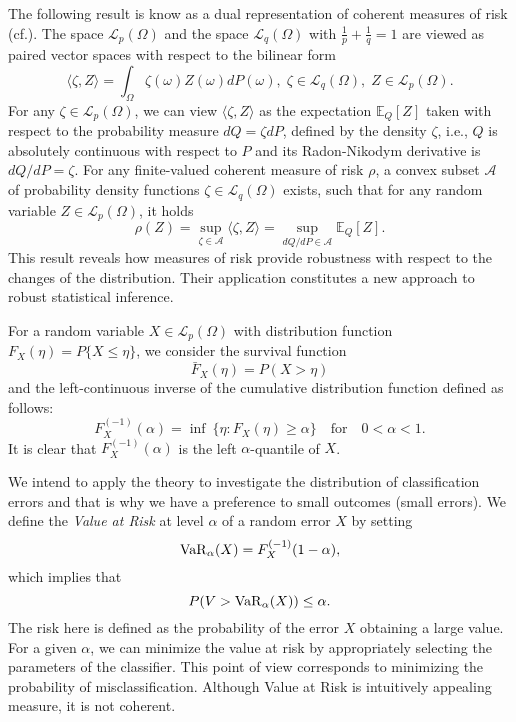 \documentclass[10pt,letterpaper]{article}
\newcommand{\E}{\mathbb{E}}
\newcommand{\Ac}{\mathcal{A}}
\newcommand{\Lc}{\mathcal{L}}
\newcommand{\1}{1{\hskip -2.55 pt}\hbox{I}}
\newtheorem{proof}{Proof}
\begin{document}
The following result is know as a dual representation of coherent measures of risk (cf.\cite{shapiro2014lectures}).
The space
${\Lc}_p(\varOmega)$ and the space ${\Lc}_q(\varOmega)$ with $\frac{1}{p} + \frac{1}{q} =1 $ are viewed as paired vector spaces with respect to the bilinear form
\begin{equation}
\label{scprod-a}
\langle \zeta,Z \rangle =\int_\varOmega \zeta (\omega) Z(\omega) dP(\omega),\;
\zeta\in \Lc_q(\varOmega),\;Z\in \Lc_p(\varOmega).
\end{equation}
For any $\zeta\in \Lc_p(\varOmega)$, we can view $\langle \zeta, Z\rangle$ as the expectation $\E_Q[Z]$ taken
with respect to the probability measure $dQ=\zeta dP$, defined by the density $\zeta$, i.e., $Q$ is absolutely  continuous with respect to $P$ and its Radon-Nikodym derivative is $dQ/dP=\zeta$.
For any finite-valued coherent measure of risk  $\rho$, a convex subset $\Ac$  of probability density functions $\zeta\in \Lc_q(\varOmega)$ exists, such that for any random variable $Z\in {\Lc}_p(\varOmega)$, it holds
\begin{equation}
\label{dualrep} \rho(Z)=\sup_{\zeta \in \Ac} \langle \zeta, Z\rangle =\sup_{dQ/dP\in \Ac}\E_Q [Z].
\end{equation}
This result reveals how measures of risk provide robustness with respect to the changes of the distribution. Their application constitutes a new approach to robust statistical inference.

For a random variable $X\in \Lc_p (\varOmega)$ with distribution
function $F_X(\eta)=P\{X \le \eta\} $, we consider the survival function
\[
\bar{F}_X(\eta) = P(X>\eta)
\]
and the left-continuous inverse of the cumulative distribution function defined as follows:
\[
 F^{(-1)}_X(\alpha) = \inf\ \{ \eta : F_X(\eta) \ge \alpha \} \quad\text{for}\quad 0 < \alpha < 1.
\]
It is clear that $F^{(-1)}_X(\alpha)$ is the left $\alpha$-quantile of $X$. 

We intend to apply the theory to investigate the distribution of classification errors and that is why we have a preference to small outcomes (small errors).
We define the \emph{Value at Risk} at level $\alpha$ of a random error $X$ by setting
\[
{\rm VaR}_{\alpha}(X) = F^{(-1)}_X(1-\alpha),%
\]
which implies that 
\[
P(V> {\rm VaR}_{\alpha}(X)) \leq \alpha.
\]
The risk here is defined as the probability of the error $X$ obtaining a large value. For a given $\alpha$, we can minimize  the value at risk by appropriately selecting the parameters of the classifier. This point of view corresponds to minimizing the probability of misclassification. 
Although Value at Risk is intuitively appealing measure, it is not coherent.
\end{document}
